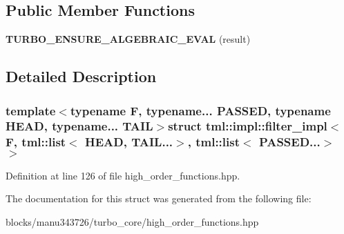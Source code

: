 \subsection*{Public Member Functions}
\begin{DoxyCompactItemize}
\item 
\hypertarget{structtml_1_1impl_1_1filter__impl_3_01_f_00_01tml_1_1list_3_01_h_e_a_d_00_01_t_a_i_l_8_8_8_4_00_2cef1b8cad91f1e60a92123e788c2419_a437798f499cc0035ad26d2d11630a064}{{\bfseries T\+U\+R\+B\+O\+\_\+\+E\+N\+S\+U\+R\+E\+\_\+\+A\+L\+G\+E\+B\+R\+A\+I\+C\+\_\+\+E\+V\+A\+L} (result)}\label{structtml_1_1impl_1_1filter__impl_3_01_f_00_01tml_1_1list_3_01_h_e_a_d_00_01_t_a_i_l_8_8_8_4_00_2cef1b8cad91f1e60a92123e788c2419_a437798f499cc0035ad26d2d11630a064}

\end{DoxyCompactItemize}


\subsection{Detailed Description}
\subsubsection*{template$<$typename F, typename... P\+A\+S\+S\+E\+D, typename H\+E\+A\+D, typename... T\+A\+I\+L$>$struct tml\+::impl\+::filter\+\_\+impl$<$ F, tml\+::list$<$ H\+E\+A\+D, T\+A\+I\+L...$>$, tml\+::list$<$ P\+A\+S\+S\+E\+D...$>$ $>$}



Definition at line 126 of file high\+\_\+order\+\_\+functions.\+hpp.



The documentation for this struct was generated from the following file\+:\begin{DoxyCompactItemize}
\item 
blocks/manu343726/turbo\+\_\+core/high\+\_\+order\+\_\+functions.\+hpp\end{DoxyCompactItemize}
